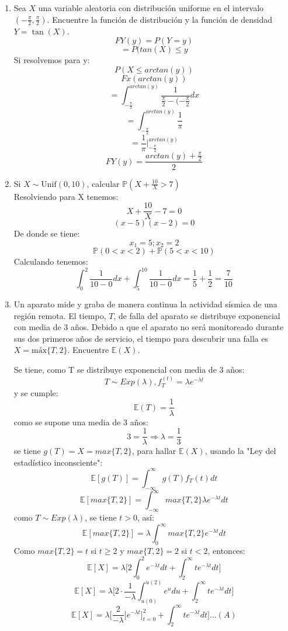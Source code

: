 \documentclass[11pt,a4paper]{report}
\begin{document}
\begin{enumerate}
		\item{
			Sea $X$ una variable aleatoria con distribución uniforme en el
			intervalo $(-\frac{\pi}{2}, \frac{\pi}{2})$. Encuentre la función de
			distribución y la función de densidad $Y = \tan(X)$.\\
			\[FY(y) = P(Y = y)\]
		\[=P(tan(X) \le y\]
		Si resolvemos para y:
		\[P(X \le arctan(y))\]
		\[Fx(arctan(y))\]
		\[= \int^{arctan(y)}_{-\frac{\pi}{2}}\frac{1}{\frac{\pi}{2}- (- \frac{\pi}{2}}dx\]
		\[= \int^{arctan(y)}_{-\frac{\pi}{2}} \frac{1}{\pi}\]
		\[=\frac{1}{\pi}|^{arctan(y)}_{-\frac{\pi}{2}}\]
		\[FY(y)=\frac{arctan(y) + \frac{\pi}{2}}{2}\]

		}

		\item{
			Si $X \sim \text{Unif}(0, 10)$, calcular
			$\mathbb{P}(X + \frac{10}{X} > 7)$\\
			Resolviendo para X tenemos:
			\[X + \frac{10}{X} - 7 = 0\]
			\[ (x - 5) (x - 2) = 0\]
			De donde se tiene:
			\[x_1 = 5 ; x_2 = 2\]
			\[\mathbb{P}(0 < x < 2) + \mathbb{P}(5 < x <10)\]
			Calculando tenemos:
			\[\int^{2}_{0}\frac{1}{10-0}dx + \int^{10}_{5}\frac{1}{10-0}dx = \frac{1}{5} + \frac{1}{2} = \frac{7}{10}\]

		}


		\item{
			Un aparato mide y graba de manera continua la actividad sísmica de
			una región remota. El tiempo, $T$, de falla del aparato se
			distribuye exponencial con media de 3 años. Debido a que el aparato
			no será monitoreado durante sus dos primeros años de servicio, el
			tiempo para descubrir una falla es $X = \text{máx}\{T,2\}$.
			Encuentre $\mathbb{E}(X)$.

			Se tiene, como T se distribuye exponencial con media de 3 años:
				$$ T \sim Exp(\lambda), f_T^{(t)} = \lambda e^{-\lambda t}$$
			y se cumple:
				$$ \mathbb{E}(T) = \frac{1}{\lambda}$$
			como se supone una media de 3 años:
				$$ 3 = \frac{1}{\lambda} \Rightarrow \lambda = \frac{1}{3}$$
			se tiene $g(T) = X = max\{T, 2\}$, para hallar $\mathbb{E}(X)$,
			usando la "Ley del estadístico inconsciente":
				$$ \mathbb{E}[g(T)] = \int_{-\infty}^{\infty} g(T) f_T{(t)}dt $$
				$$ \mathbb{E}[max\{T,2\}] = \int_{-\infty}^{\infty} max\{T,2\}
				 							\lambda e^{-\lambda t} dt $$
			como $T \sim Exp(\lambda)$, se tiene $t > 0$, así:
				$$ \mathbb{E}[max\{T,2\}] = \lambda \int_{0}^{\infty} max\{T,2\}
				 							e^{-\lambda t} dt $$
			Como $max\{T,2\} = t$ si $t \geq 2$ y $max\{T,2\} = 2$ si $t < 2$,
			entonces:
				$$ \mathbb{E}[X] =\lambda \Big[ 2\int_{0}^{2} e^{-\lambda t} dt
				              + \int_{2}^{\infty} t e^{-\lambda t} dt \Big] $$
				$$ \mathbb{E}[X] =\lambda \Big[ 2 \cdot
								 \frac{1}{-\lambda}\int_{u(0)}^{u(2)} e^u du
				              + \int_{2}^{\infty} t e^{-\lambda t} dt \Big] $$
				$$ \mathbb{E}[X] =\lambda \Big[
								 \frac{2}{-\lambda} \Big[ e^{-\lambda t}
								 \Big]_{t=0}^{2}
				              + \int_{2}^{\infty} t e^{-\lambda t} dt \Big]
							  	...(A)$$

}
\end{enumerate}
\end{document}
